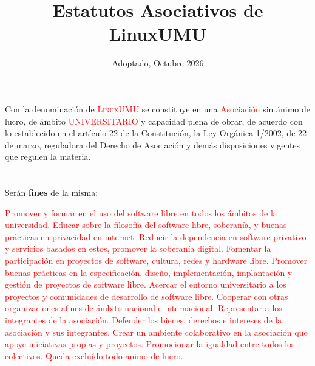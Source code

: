 \documentclass[draft]{estatutos}
\title{Estatutos Asociativos de LinuxUMU}
\date{
  Adoptado, Octubre 2026
}
\begin{document}
\maketitle

\begin{linenumbers}[1]
  

  \section{}
  Con la denominación de \textcolor{red}{\textsc{LinuxUMU}}
  se constituye en una \textcolor{red}{Asociación} sin ánimo de lucro, de ámbito \textcolor{red}{UNIVERSITARIO} y
  capacidad plena de obrar, de acuerdo con lo establecido en el artículo 22 de
  la Constitución, la Ley Orgánica 1/2002, de 22 de marzo, reguladora del
  Derecho de Asociación y demás disposiciones vigentes que regulen la materia.

  \section{}
  Serán \textbf{fines} de la misma:

\textcolor{red}{
  \begin{enumerate}
  \sub Promover y formar en el uso del software libre en todos los ámbitos de
      la universidad.
  \sub Educar sobre la filosofía del software libre, soberanía, y buenas
      prácticas en privacidad en internet.
  \sub Reducir la dependencia en software privativo y servicios basados en
      estos, promover la soberanía digital.
  \sub Fomentar la participación en proyectos de software, cultura, redes y
      hardware libre.
  \sub Promover buenas prácticas en la especificación, diseño, implementación,
      implantación y gestión de
      proyectos de software libre.
  \sub Acercar el entorno universitario a los proyectos y comunidades de
      desarrollo de software libre.
  \sub Cooperar con otras organizaciones afines de ámbito nacional e
      internacional.
  \sub Representar a los integrantes de la asociación.
  \sub Defender los bienes, derechos e intereses de la asociación y sus
      integrantes.
  \sub Crear un ambiente colaborativo en la asociación que apoye iniciativas
      propias y proyectos.
  \sub Promocionar la igualdad entre todos los colectivos.
  \sub Queda excluído todo animo de lucro.
  \end{enumerate}
}


\end{linenumbers}
\end{document}
